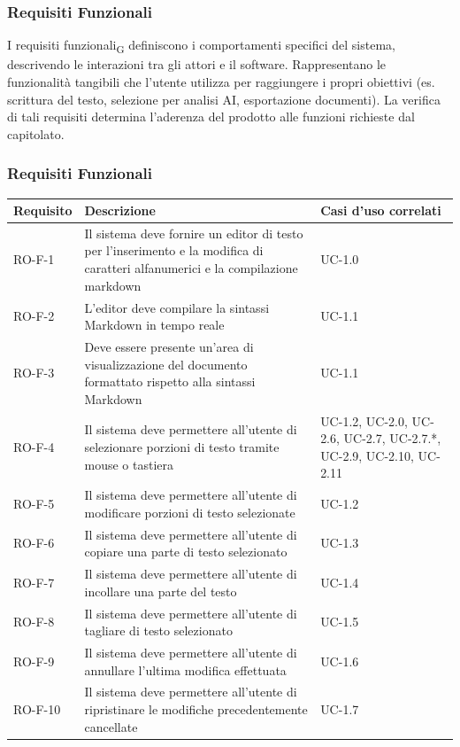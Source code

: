 \documentclass[11pt,a4paper]{article}
\begin{document}
\subsubsection{Requisiti Funzionali}
I requisiti funzionali\textsubscript{G} definiscono i comportamenti specifici del sistema, descrivendo le interazioni tra gli attori e il software.
Rappresentano le funzionalità tangibili che l'utente utilizza per raggiungere i propri obiettivi (es. scrittura del testo, selezione per analisi AI, esportazione documenti). La verifica di tali requisiti determina l'aderenza del prodotto alle funzioni richieste dal capitolato.

\subsubsection{Requisiti Funzionali}
\begin{longtable}{|p{}|>{\raggedright\arraybackslash}p{}|p{}|}
\hline
\textbf{Requisito} & \textbf{Descrizione} & \textbf{Casi d'uso correlati}\\
\hline
\endhead
RO-F-1 & Il sistema deve fornire un editor di testo per l'inserimento e la modifica di caratteri alfanumerici e la compilazione markdown& UC-1.0 \\
\hline
RO-F-2 & L'editor deve compilare la sintassi Markdown in tempo reale & UC-1.1 \\
\hline
RO-F-3 & Deve essere presente un'area di visualizzazione del documento formattato rispetto alla sintassi Markdown & UC-1.1 \\
\hline
RO-F-4 & Il sistema deve permettere all'utente di selezionare porzioni di testo tramite mouse o tastiera & UC-1.2, UC-2.0, UC-2.6, UC-2.7, UC-2.7.*, UC-2.9, UC-2.10, UC-2.11 \\
\hline
RO-F-5 & Il sistema deve permettere all'utente di modificare porzioni di testo selezionate & UC-1.2 \\
\hline
RO-F-6 & Il sistema deve permettere all'utente di copiare una parte di testo selezionato& UC-1.3 \\
\hline
RO-F-7 & Il sistema deve permettere all'utente di incollare una parte del testo & UC-1.4 \\
\hline
RO-F-8 & Il sistema deve permettere all'utente di tagliare di testo selezionato & UC-1.5 \\
\hline
RO-F-9 & Il sistema deve permettere all'utente di annullare l'ultima modifica effettuata & UC-1.6 \\
\hline
RO-F-10 & Il sistema deve permettere all'utente di ripristinare le modifiche precedentemente cancellate & UC-1.7 \\

\end{longtable}
\end{document}
